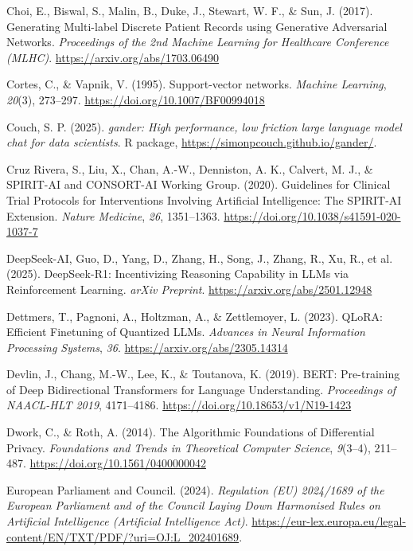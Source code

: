 \documentclass[
  letterpaper,
  11pt]{scrbook}
\newlength{\cslhangindent}
\newenvironment{CSLReferences}[2] %
 {\begin{list}{}{%
  \setlength{\itemindent}{0pt}
  \setlength{\leftmargin}{0pt}
  \setlength{\parsep}{0pt}
  \ifodd #1
   \setlength{\leftmargin}{\cslhangindent}
   \setlength{\itemindent}{-1\cslhangindent}
  \fi
  \setlength{\itemsep}{#2\baselineskip}}}
 {\end{list}}
\begin{document}
\begin{CSLReferences}{1}{0}
Choi, E., Biswal, S., Malin, B., Duke, J., Stewart, W. F., \& Sun, J.
(2017). {Generating Multi-label Discrete Patient Records using
Generative Adversarial Networks}. \emph{Proceedings of the 2nd Machine
Learning for Healthcare Conference (MLHC)}.
\url{https://arxiv.org/abs/1703.06490}

Cortes, C., \& Vapnik, V. (1995). Support-vector networks. \emph{Machine
Learning}, \emph{20}(3), 273--297.
\url{https://doi.org/10.1007/BF00994018}

Couch, S. P. (2025). \emph{{gander}: High performance, low friction
large language model chat for data scientists}. R package,
\url{https://simonpcouch.github.io/gander/}.

Cruz Rivera, S., Liu, X., Chan, A.-W., Denniston, A. K., Calvert, M. J.,
\& SPIRIT-AI and CONSORT-AI Working Group. (2020). {Guidelines for
Clinical Trial Protocols for Interventions Involving Artificial
Intelligence}: {The SPIRIT-AI Extension}. \emph{Nature Medicine},
\emph{26}, 1351--1363. \url{https://doi.org/10.1038/s41591-020-1037-7}

{DeepSeek-AI, Guo, D., Yang, D., Zhang, H., Song, J., Zhang, R., Xu, R.,
et al.} (2025). {DeepSeek-R1}: {Incentivizing Reasoning Capability in
LLMs via Reinforcement Learning}. \emph{arXiv Preprint}.
\url{https://arxiv.org/abs/2501.12948}

Dettmers, T., Pagnoni, A., Holtzman, A., \& Zettlemoyer, L. (2023).
{QLoRA}: {Efficient Finetuning of Quantized LLMs}. \emph{Advances in
Neural Information Processing Systems}, \emph{36}.
\url{https://arxiv.org/abs/2305.14314}

Devlin, J., Chang, M.-W., Lee, K., \& Toutanova, K. (2019). {BERT}:
{Pre-training of Deep Bidirectional Transformers for Language
Understanding}. \emph{Proceedings of NAACL-HLT 2019}, 4171--4186.
\url{https://doi.org/10.18653/v1/N19-1423}

Dwork, C., \& Roth, A. (2014). {The Algorithmic Foundations of
Differential Privacy}. \emph{Foundations and Trends in Theoretical
Computer Science}, \emph{9}(3--4), 211--487.
\url{https://doi.org/10.1561/0400000042}

European Parliament and Council. (2024). \emph{{Regulation (EU)
2024/1689 of the European Parliament and of the Council Laying Down
Harmonised Rules on Artificial Intelligence (Artificial Intelligence
Act)}}.
\url{https://eur-lex.europa.eu/legal-content/EN/TXT/PDF/?uri=OJ:L_202401689}.


\end{CSLReferences}
\end{document}
